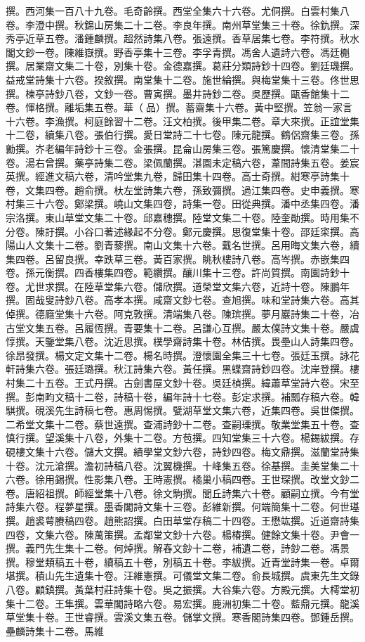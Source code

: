 \begin{pinyinscope}
撰。西河集一百八十九卷。毛奇齡撰。西堂全集六十六卷。尤侗撰。白雲村集八卷。李澄中撰。秋錦山房集二十二卷。李良年撰。南州草堂集三十卷。徐釚撰。深秀亭近草五卷。潘鍾麟撰。超然詩集八卷。張遠撰。香草居集七卷。李符撰。秋水閣文鈔一卷。陳維嶽撰。野香亭集十三卷。李孚青撰。馮舍人遺詩六卷。馮廷櫆撰。居業齋文集二十卷，別集十卷。金德嘉撰。葛莊分類詩鈔十四卷。劉廷璣撰。益戒堂詩集十六卷。揆敘撰。南堂集十二卷。施世綸撰。與梅堂集十三卷。佟世思撰。楝亭詩鈔八卷，文鈔一卷。曹寅撰。墨井詩鈔二卷。吳歷撰。甌香館集十二卷。惲格撰。離垢集五卷。華（品）撰。蓄齋集十六卷。黃中堅撰。笠翁一家言十六卷。李漁撰。柯庭餘習十二卷。汪文柏撰。後甲集二卷。章大來撰。正誼堂集十二卷，續集八卷。張伯行撰。愛日堂詩二十七卷。陳元龍撰。鶴侶齋集三卷。孫勷撰。岕老編年詩鈔十三卷。金張撰。昆侖山房集三卷。張篤慶撰。懷清堂集二十卷。湯右曾撰。藥亭詩集二卷。梁佩蘭撰。湛園未定稿六卷，葦間詩集五卷。姜宸英撰。經進文稿六卷，清吟堂集九卷，歸田集十四卷。高士奇撰。紺寒亭詩集十卷，文集四卷。趙俞撰。杕左堂詩集六卷，孫致彌撰。過江集四卷。史申義撰。寒村集三十六卷。鄭梁撰。嶢山文集四卷，詩集一卷。田從典撰。潘中丞集四卷。潘宗洛撰。東山草堂文集二十卷。邱嘉穗撰。陸堂文集二十卷。陸奎勛撰。時用集不分卷。陳訏撰。小谷口著述緣起不分卷。鄭元慶撰。思復堂集十卷。邵廷寀撰。高陽山人文集十二卷。劉青藜撰。南山文集十六卷。戴名世撰。呂用晦文集六卷，續集四卷。呂留良撰。幸跌草三卷。黃百家撰。眺秋樓詩八卷。高岑撰。赤嵌集四卷。孫元衡撰。四香樓集四卷。範纘撰。釀川集十三卷。許尚質撰。南園詩鈔十卷。尤世求撰。在陸草堂集六卷。儲欣撰。道榮堂文集六卷，近詩十卷。陳鵬年撰。固哉叟詩鈔八卷。高孝本撰。咸齋文鈔七卷。查旭撰。味和堂詩集六卷。高其倬撰。德廕堂集十六卷。阿克敦撰。清端集八卷。陳瑸撰。夢月巖詩集二十卷，冶古堂文集五卷。呂履恆撰。青要集十二卷。呂謙心互撰。嚴太僕詩文集十卷。嚴虞惇撰。天鑒堂集八卷。沈近思撰。樸學齋詩集十卷。林佶撰。畏壘山人詩集四卷。徐昂發撰。楊文定文集十二卷。楊名時撰。澄懷園全集三十七卷。張廷玉撰。詠花軒詩集六卷。張廷璐撰。秋江詩集六卷。黃任撰。黑蝶齋詩鈔四卷。沈岸登撰。樓村集二十五卷。王式丹撰。古劍書屋文鈔十卷。吳廷楨撰。緯蕭草堂詩六卷。宋至撰。彭南畇文稿十二卷，詩稿十卷，編年詩十七卷。彭定求撰。補瓢存稿六卷。韓騏撰。硯溪先生詩稿七卷。惠周惕撰。甓湖草堂文集六卷，近集四卷。吳世傑撰。二希堂文集十二卷。蔡世遠撰。查浦詩鈔十二卷。查嗣瑮撰。敬業堂集五十卷。查慎行撰。望溪集十八卷，外集十二卷。方苞撰。四知堂集三十六卷。楊錫紱撰。存硯樓文集十六卷。儲大文撰。績學堂文鈔六卷，詩鈔四卷。梅文鼎撰。滋蘭堂詩集十卷。沈元滄撰。澹初詩稿八卷。沈翼機撰。十峰集五卷。徐基撰。圭美堂集二十六卷。徐用錫撰。性影集八卷。王時憲撰。橘巢小稿四卷。王世琛撰。改堂文鈔二卷。唐紹祖撰。師經堂集十八卷。徐文駒撰。閭丘詩集六十卷。顧嗣立撰。今有堂詩集六卷。程夢星撰。墨香閣詩文集十三卷。彭維新撰。何端簡集十二卷。何世璂撰。趙裘萼賸稿四卷。趙熊詔撰。白田草堂存稿二十四卷。王懋竑撰。近道齋詩集四卷，文集六卷。陳萬策撰。孟鄰堂文鈔十六卷。楊椿撰。健餘文集十卷。尹會一撰。義門先生集十二卷。何焯撰。解舂文鈔十二卷，補遺二卷，詩鈔二卷。馮景撰。穆堂類稿五十卷，續稿五十卷，別稿五十卷。李紱撰。近青堂詩集一卷。卓爾堪撰。積山先生遺集十卷。汪維憲撰。可儀堂文集二卷。俞長城撰。虞東先生文錄八卷。顧鎮撰。黃葉村莊詩集十卷。吳之振撰。大谷集六卷。方殿元撰。大樗堂初集十二卷。王隼撰。雲華閣詩略六卷。易宏撰。鹿洲初集二十卷。藍鼎元撰。龍溪草堂集十卷。王世睿撰。雲溪文集五卷。儲掌文撰。寒香閣詩集四卷。鄧鍾岳撰。壘麟詩集十二卷。馬維
\end{pinyinscope}
